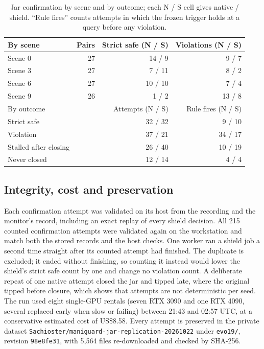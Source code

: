 \begin{table}[t]
\caption{Jar confirmation by scene and by outcome; each N / S cell gives native /
shield. ``Rule
fires'' counts attempts in which the frozen trigger holds at a query before any
violation.}
\label{tab:jar-detail}\centering\small
\begin{tabular}{lrrr}
\toprule
By scene & Pairs & Strict safe (N / S) & Violations (N / S) \\
\midrule
Scene 0 & 27 & 14 / 9 & 9 / 7 \\
Scene 3 & 27 & 7 / 11 & 8 / 2 \\
Scene 6 & 27 & 10 / 10 & 7 / 4 \\
Scene 9 & 26 & 1 / 2 & 13 / 8 \\
\midrule
By outcome & & Attempts (N / S) & Rule fires (N / S) \\
\midrule
Strict safe & & 32 / 32 & 9 / 10 \\
Violation & & 37 / 21 & 34 / 17 \\
Stalled after closing & & 26 / 40 & 10 / 19 \\
Never closed & & 12 / 14 & 4 / 4 \\
\bottomrule
\end{tabular}
\end{table}

\subsection{Integrity, cost and preservation}
Each confirmation attempt was validated on its host from the recording and
the monitor's record, including an exact replay of every shield decision.
All 215 counted confirmation attempts were validated again on the workstation
and match both the stored records and the host checks. One worker ran a
shield job a second time straight after its counted attempt had finished. The
duplicate is excluded; it ended without finishing, so counting it instead
would lower the shield's strict safe count by one and change no violation
count. A deliberate repeat of one native attempt closed the jar and tipped
late, where the original tipped before closure, which shows that attempts are
not deterministic per seed. The run used eight single-GPU rentals (seven RTX
3090 and one RTX 4090, several replaced early when slow or failing) between
21:43 and 02:57 UTC, at a conservative estimated cost of US\$8.58. Every attempt
is preserved in the private dataset
\texttt{Sachioster/maniguard-jar-replication-20261022} under
\texttt{evo19/}, revision \texttt{98e8fe31}, with 5,564 files re-downloaded
and checked by SHA-256.
